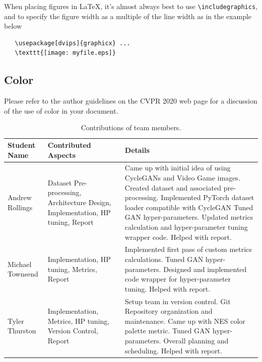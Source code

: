 \documentclass[10pt,twocolumn,letterpaper]{article}
\begin{document}
When placing figures in \LaTeX, it's almost always best to use
\verb+\includegraphics+, and to specify the  figure width as a multiple of
the line width as in the example below
   {\small\begin{verbatim}
   \usepackage[dvips]{graphicx} ...
   \texttt{[image: myfile.eps]}
\end{verbatim}
   }


\subsection{Color}

Please refer to the author guidelines on the CVPR 2020 web page for a discussion
of the use of color in your document.


\begin{table}
   \begin{center}
   \begin{tabular}{|p{3cm}|p{5.5cm}|p{8.5cm}|}
   \hline
   \textbf{Student Name} & \textbf{Contributed Aspects} & \textbf{Details} \\
   \hline\hline
   Andrew Rollings & Dataset Pre-processing, Architecture Design, Implementation, HP tuning, Report & Came up with initial idea of using CycleGANs and Video Game images. Created dataset and associated pre-processing. Implemented PyTorch dataset loader compatible with CycleGAN Tuned GAN hyper-parameters. Updated metrics calculation and hyper-parameter tuning wrapper code. Helped with report.\\
   \hline
   Michael Townsend & Implementation, HP tuning, Metrics, Report & Implemented first pass of custom metrics calculations. Tuned GAN hyper-parameters. Designed and implemented code wrapper for hyper-parameter tuning. Helped with report. \\
   \hline
   Tyler Thurston & Implementation, Metrics, HP tuning, Version Control, Report & Setup team in version control. Git Repository organization and maintenance. Came up with NES color palette metric. Tuned GAN hyper-parameters. Overall planning and scheduling. Helped with report.  \\
   \hline
   \end{tabular}
   \end{center}
   \caption{Contributions of team members.}
   \label{tab:contributions}
   \end{table}




{\small


}
\end{document}
